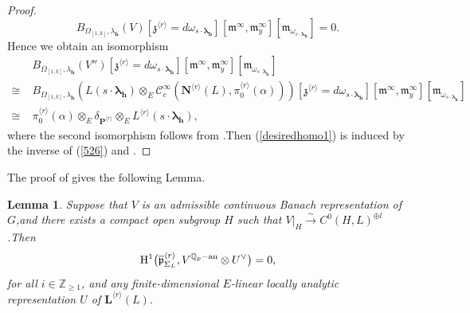 \documentclass[SecEq,CM,GP]{degruyter-crelle} %
\theoremstyle{plain}
\newtheorem{lem}[thm]{Lemma}
\newcommand{\ana}{{\rm an}}
\newcommand{\bersteineigenvarpik}{{\mathcal{E}_{\omepik,\fp,\bm{\lambda}_\bh}^\infty(\overline{\rho})}}
\newcommand{\hH}{{\mathrm{H}}}
\newcommand{\lamoverx}{{L^{\lrr}({\bm\lambda}_\bh)}}
\newcommand{\lrr}{{\langle r\rangle}}
\newcommand{\omepik}{\Omega_{[1,k]}}
\newcommand{\rigerchl}{{\mathcal{Z}_{\bL_{\ul{n}},L}}}
\newcommand{\te}{{\otimes_E}}
\newcommand{\ul}{\underline}
\newcommand{\BQ}{{\mathbb{Q}}}
\newcommand{\BZ}{{\mathbb{Z}}}
\newcommand{\bL}{{\mathbf{L}}}
\newcommand{\bN}{{\mathbf{N}}}
\newcommand{\bP}{{\mathbf{P}}}
\newcommand{\bZ}{{\mathbf{Z}}}
\newcommand{\bh}{{\mathbf{h}}}
\newcommand{\cC}{\mathcal C}
\newcommand{\fm}{{\mathfrak{m}}}
\newcommand{\fp}{{\mathfrak{p}}}
\newcommand{\fz}{{\mathfrak{z}}}
\begin{document}
\begin{proof}
\[B_{\omepik,\lambda_\bh}(V)[\fz^{\lrr}=d\omega_{s\cdot{\bm\lambda}_\bh}][\fm^\infty,\fm_y^\infty][
\fm_{\omega_{s\cdot{\bm\lambda}_\bh}}]=0.\]
Hence we obtain an isomorphism
\begin{equation}\label{526}
	\begin{aligned}
		&B_{\omepik,\lambda_\bh}(V'')[\fz^{\lrr}=d\omega_{s\cdot{\bm\lambda}_\bh}][\fm^\infty,\fm_y^\infty][
		\fm_{\omega_{s\cdot{\bm\lambda}_\bh}}]\\
		\cong\;&B_{\omepik,\lambda_\bh}(L(s\cdot{\bm\lambda}_\bh)\otimes_E\cC^{\infty}_c(\bN^{\lrr}(L),\pi_0^{\lrr}(\alpha)))[\fz^{\lrr}=d\omega_{s\cdot{\bm\lambda}_\bh}][\fm^\infty,\fm_y^\infty][
		\fm_{\omega_{s\cdot{\bm\lambda}_\bh}}]\\ \cong\;&\pi_0^{\lrr}(\alpha)\te \delta_{\bP^{\lrr}}\te L^{\lrr}(s\cdot{\bm\lambda}_\bh),
	\end{aligned}
\end{equation}
where the second isomorphism follows from \cite[Lemma 3.5.2]{emerton2006jacquet}.\;Then (\ref{desiredhomo1}) is induced by the inverse of (\ref{526}) and \cite[Theorem.6]{emerton2006jacquet}.\;
\end{proof}

The proof of \cite[Example 4.2]{bergdall2018adjunction} gives the following Lemma.\;
\begin{lem}\label{fpacycilic}Suppose that $V$ is an admissible continuous Banach representation of $G$,\;and there exists a compact open subgroup $H$ such that $V|_H\xrightarrow{\sim}C^0(H,L)^{\oplus l}$.\;Then 
\begin{equation}
	\hH^1\big(\overline{\fp}^{\lrr}_{\Sigma_L},V^{\BQ_p-\ana}\otimes U^\vee\big)=0,
\end{equation}
for all $i\in \BZ_{\geq 1}$, and any finite-dimensional $E$-linear locally analytic representation $U$ of $\bL^{\lrr}(L)$.\;
\end{lem}
\end{document}
